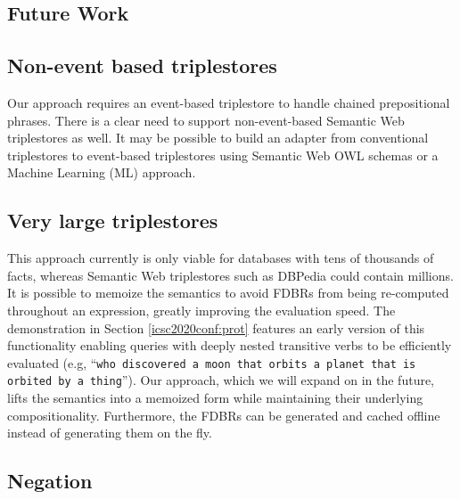\documentclass[../main.tex]{subfiles}
\begin{document}
\begin{refsection}


\section{Future Work}

\subsection{Non-event based triplestores}

Our approach requires an event-based triplestore to handle chained prepositional phrases. There is a clear need to support non-event-based Semantic Web triplestores as well. It may be possible to build an adapter from conventional triplestores to event-based triplestores using Semantic Web OWL schemas or a Machine Learning (ML) approach.

\subsection{Very large triplestores}

This approach currently is only viable for databases with tens of thousands of facts, whereas Semantic Web triplestores such as DBPedia \cite{dbpedia} could contain millions.  It is possible to memoize the semantics to avoid FDBRs from being re-computed throughout an expression, greatly improving the evaluation speed.  The demonstration in Section \ref{icsc2020conf:prot} features an early version of this functionality enabling queries with deeply nested transitive verbs to be efficiently evaluated (e.g, ``\texttt{who discovered a moon that orbits a planet that is orbited by a thing}'').  Our approach, which we will expand on in the future, lifts the semantics into a memoized form while maintaining their underlying compositionality.  Furthermore, the FDBRs can be generated and cached offline instead of generating them on the fly.

\subsection{Negation}


\end{refsection}
\end{document}
